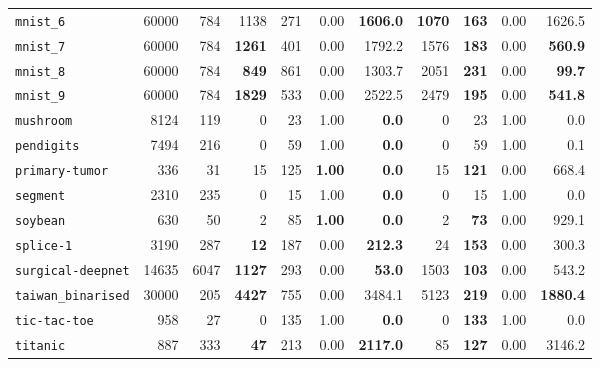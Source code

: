 \begin{tabular}{lccrrrrrrrr}
\texttt{mnist\_6} & \multicolumn{1}{r}{60000} & \multicolumn{1}{r}{784}  & 1138 & 271 & 0.00 & \textbf{1606.0} & \textbf{1070} & \textbf{163} & 0.00 & 1626.5\\
\texttt{mnist\_7} & \multicolumn{1}{r}{60000} & \multicolumn{1}{r}{784}  & \textbf{1261} & 401 & 0.00 & 1792.2 & 1576 & \textbf{183} & 0.00 & \textbf{560.9}\\
\texttt{mnist\_8} & \multicolumn{1}{r}{60000} & \multicolumn{1}{r}{784}  & \textbf{849} & 861 & 0.00 & 1303.7 & 2051 & \textbf{231} & 0.00 & \textbf{99.7}\\
\texttt{mnist\_9} & \multicolumn{1}{r}{60000} & \multicolumn{1}{r}{784}  & \textbf{1829} & 533 & 0.00 & 2522.5 & 2479 & \textbf{195} & 0.00 & \textbf{541.8}\\
\texttt{mushroom} & \multicolumn{1}{r}{8124} & \multicolumn{1}{r}{119}  & 0 & 23 & 1.00 & \textbf{0.0} & 0 & 23 & 1.00 & 0.0\\
\texttt{pendigits} & \multicolumn{1}{r}{7494} & \multicolumn{1}{r}{216}  & 0 & 59 & 1.00 & \textbf{0.0} & 0 & 59 & 1.00 & 0.1\\
\texttt{primary-tumor} & \multicolumn{1}{r}{336} & \multicolumn{1}{r}{31}  & 15 & 125 & \textbf{1.00} & \textbf{0.0} & 15 & \textbf{121} & 0.00 & 668.4\\
\texttt{segment} & \multicolumn{1}{r}{2310} & \multicolumn{1}{r}{235}  & 0 & 15 & 1.00 & \textbf{0.0} & 0 & 15 & 1.00 & 0.0\\
\texttt{soybean} & \multicolumn{1}{r}{630} & \multicolumn{1}{r}{50}  & 2 & 85 & \textbf{1.00} & \textbf{0.0} & 2 & \textbf{73} & 0.00 & 929.1\\
\texttt{splice-1} & \multicolumn{1}{r}{3190} & \multicolumn{1}{r}{287}  & \textbf{12} & 187 & 0.00 & \textbf{212.3} & 24 & \textbf{153} & 0.00 & 300.3\\
\texttt{surgical-deepnet} & \multicolumn{1}{r}{14635} & \multicolumn{1}{r}{6047}  & \textbf{1127} & 293 & 0.00 & \textbf{53.0} & 1503 & \textbf{103} & 0.00 & 543.2\\
\texttt{taiwan\_binarised} & \multicolumn{1}{r}{30000} & \multicolumn{1}{r}{205}  & \textbf{4427} & 755 & 0.00 & 3484.1 & 5123 & \textbf{219} & 0.00 & \textbf{1880.4}\\
\texttt{tic-tac-toe} & \multicolumn{1}{r}{958} & \multicolumn{1}{r}{27}  & 0 & 135 & 1.00 & \textbf{0.0} & 0 & \textbf{133} & 1.00 & 0.0\\
\texttt{titanic} & \multicolumn{1}{r}{887} & \multicolumn{1}{r}{333}  & \textbf{47} & 213 & 0.00 & \textbf{2117.0} & 85 & \textbf{127} & 0.00 & 3146.2\\

\end{tabular}
